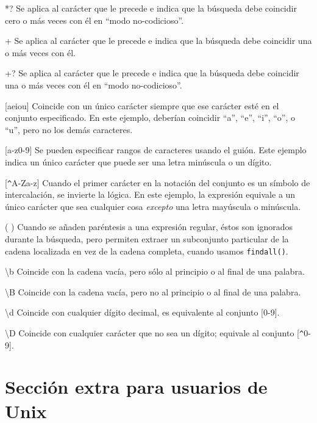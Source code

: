 *? \newline
Se aplica al carácter que le precede e indica que la búsqueda debe coincidir cero o más veces con él
en ``modo no-codicioso''.

+ \newline
Se aplica al carácter que le precede e indica que la búsqueda debe coincidir una o más veces con él.

+? \newline
Se aplica al carácter que le precede e indica que la búsqueda debe coincidir una o más veces con él
en ``modo no-codicioso''.

[aeiou] \newline
Coincide con un único carácter siempre que ese carácter esté en el conjunto especificado. En este ejemplo,
deberían coincidir ``a'', ``e'', ``i'', ``o'', o ``u'', pero no los demás caracteres.

[a-z0-9] \newline
Se pueden especificar rangos de caracteres usando el guión. Este ejemplo indica un único carácter
que puede ser una letra minúscula o un dígito.

[\verb"^"A-Za-z] \newline
Cuando el primer carácter en la notación del conjunto es un símbolo de intercalación, se invierte la lógica.
En este ejemplo, la expresión equivale a un único carácter que sea cualquier cosa {\em excepto} una letra
mayúscula o minúscula.

( ) \newline
Cuando se añaden paréntesis a una expresión regular, éstos son ignorados durante la búsqueda,
pero permiten extraer un subconjunto particular de la cadena localizada en vez de la cadena
completa, cuando usamos {\tt findall()}.

{\textbackslash}b \newline
Coincide con la cadena vacía, pero sólo al principio o al final de una palabra.

{\textbackslash}B \newline
Coincide con la cadena vacía, pero no al principio o al final de una palabra.

{\textbackslash}d \newline
Coincide con cualquier dígito decimal, es equivalente al conjunto [0-9].

{\textbackslash}D \newline
Coincide con cualquier carácter que no sea un dígito; equivale al conjunto [\verb"^"0-9].

\section{Sección extra para usuarios de Unix}

